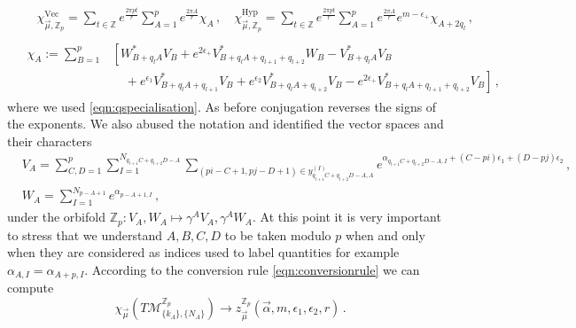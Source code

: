 \documentclass[main.tex]{subfiles}
\begin{document}
\begin{align}
&\begin{aligned}
&\chi_{\vec{\mu},\mathbb{Z}_p}^{\text{Vec}}=\sum_{t\in\mathbb{Z}}e^{\frac{2\pi pt}{r}}\sum_{A=1}^pe^{\frac{2\pi A}{r}}\chi_{A}\,,\quad \chi_{\vec{\mu},\mathbb{Z}_p}^{\text{Hyp}}=\sum_{t\in\mathbb{Z}}e^{\frac{2\pi pt}{r}}\sum_{A=1}^pe^{\frac{2\pi A}{r}}e^{m-\epsilon_+}\chi_{A+2q_l}\,,
\end{aligned}\\
&\begin{aligned}
\chi_{A}:=\sum_{B=1}^p&\left[W^*_{B+q_lA}V_B+e^{2\epsilon_+}V^*_{B+q_lA+q_{l+1}+q_{l+2}}W_B-V_{B+q_lA}^*V_{B}\right.\\
&\left.\quad+e^{\epsilon_1}V_{B+q_lA+q_{l+1}}^*V_{B}+e^{\epsilon_2}V_{B+q_lA+q_{l+2}}^*V_{B}-e^{2\epsilon_+}V_{B+q_lA+q_{l+1}+q_{l+2}}^*V_{B}\right]\,,
\end{aligned}
\end{align}
where we used \eqref{eqn:qspecialisation}. As before conjugation reverses the signs of the exponents. We also abused the notation and identified the vector spaces and their characters
\begin{align}
&V_A=\sum_{C,D=1}^p\sum_{I=1}^{N_{q_{l+1}C+q_{l+2}D-A}}\sum_{(pi-C+1,pj-D+1)\in y_{q_{l+1}C+q_{l+2}D-A,A}^{(I)}}e^{\alpha_{q_{l+1}C+q_{l+2}D-A,I}+(C-pi)\epsilon_1+(D-pj)\epsilon_2}\,,\\
&W_A=\sum_{I=1}^{N_{p-A+1}}e^{\alpha_{p-A+1,I}}\,,
\end{align}
under the orbifold $\mathbb{Z}_p:V_A,W_A\mapsto \gamma^AV_A,\gamma^AW_A$. At this point it is very important to stress that we understand $A,B,C,D$ to be taken modulo $p$ when and only when they are considered as indices used to label quantities for example $\alpha_{A,I}=\alpha_{A+p,I}$.
According to the conversion rule \eqref{eqn:conversionrule} we can compute
\begin{equation}
\chi_{\vec{\mu}}\left(T\mathcal{M}_{\{k_A\},\{N_A\}}^{\mathbb{Z}_p}\right)\to z^{\mathbb{Z}_p}_{\vec{\mu}}\left(\vec{\alpha},m,\epsilon_1,\epsilon_2,r\right)\,.
\end{equation}
\end{document}
